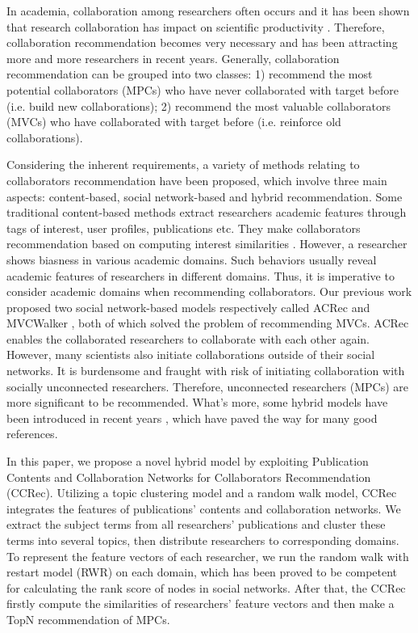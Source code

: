 \documentclass[10pt]{article}
\begin{document}
In academia, collaboration among researchers often occurs and it has been shown that research collaboration has impact on scientific productivity \cite{lee2005impact}. Therefore, collaboration recommendation becomes very necessary and has been attracting more and more researchers in recent years. Generally, collaboration recommendation can be grouped into two classes: 1) recommend the most potential collaborators (MPCs) who have never collaborated with target before (i.e. build new collaborations); 2) recommend the most valuable collaborators (MVCs) who have collaborated with target before (i.e. reinforce old collaborations).

Considering the inherent requirements, a variety of methods relating to collaborators recommendation have been proposed, which involve three main aspects: content-based, social network-based and hybrid recommendation. Some traditional content-based methods extract researchers academic features through tags of interest, user profiles, publications etc. They make collaborators recommendation based on computing interest similarities \cite{lopes2010collaboration,gollapalli2012similar,kim2010collaborative}. However, a researcher shows biasness in various academic domains. Such behaviors usually reveal academic features of researchers in different domains. Thus, it is imperative to consider academic domains when recommending collaborators. Our previous work proposed two social network-based models respectively called ACRec \cite{li2014acrec} and MVCWalker \cite{xia2014mvcwalker}, both of which solved the problem of recommending MVCs. ACRec enables the collaborated researchers to collaborate with each other again. However, many scientists also initiate collaborations outside of their social networks. It is burdensome and fraught with risk of initiating collaboration with socially unconnected researchers. Therefore, unconnected researchers (MPCs) are more significant to be recommended. What's more, some hybrid models have been introduced in recent years \cite{lee2011recommending,chen2011collabseer,cohen2013recommending,chaiwanarom2014collaborator,petertonkoker2014scientific,li2014author,xia2014socially}, which have paved the way for many good references.

In this paper, we propose a novel hybrid model by exploiting Publication Contents and Collaboration Networks for Collaborators Recommendation (CCRec). Utilizing a topic clustering model \cite{pan2010research} \cite{pham2011clustering} and a random walk model, CCRec integrates the features of publications' contents and collaboration networks. We extract the subject terms from all researchers' publications and cluster these terms into several topics, then distribute researchers to corresponding domains. To represent the feature vectors of each researcher, we run the random walk with restart model (RWR) on each domain, which has been proved to be competent for calculating the rank score of nodes in social networks. After that, the CCRec firstly compute the similarities of researchers' feature vectors and then make a TopN recommendation of MPCs.
\end{document}

